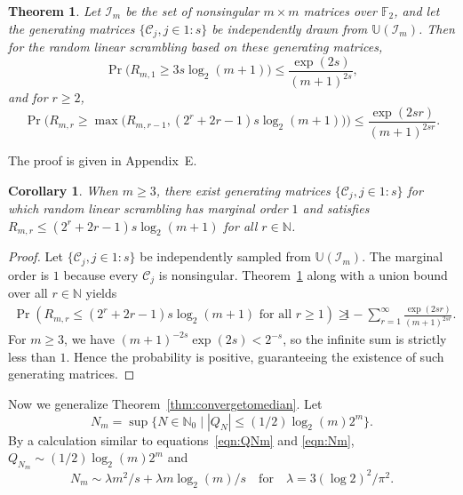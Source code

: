 \documentclass{article}
\newtheorem{theorem}{Theorem}
\newtheorem{corollary}{Corollary}
\theoremstyle{definition}
\renewcommand{\le}{\leqslant}
\renewcommand{\leq}{\leqslant}
\renewcommand{\geq}{\geqslant}
\newcommand{\natu}{\mathbb{N}}
\newcommand{\dunif}{\mathbb{U}}
\newcommand{\appE}{E}
\begin{document}
\begin{theorem}\label{thm:Rmr}
Let $\mathcal{I}_m$ be the set of nonsingular $m\times m$ matrices over $\mathbb{F}_2$, and let the generating matrices $\{\mathcal{C}_j, j\in 1{:}s\}$ be independently drawn from $\dunif (\mathcal{I}_m)$.
Then for the random linear scrambling based on these generating matrices,
    \begin{equation*}
        \Pr\Big(R_{m,1}\geq 3s\log_2(m+1) \Big) \leq \frac{\exp(2s)}{(m+1)^{2s}},
    \end{equation*}
    and for $r\geq 2$,
    \begin{equation*}
        \Pr\Big(R_{m,r}\geq \max\big(R_{m,r-1},(2^{r}+2r-1)s\log_2(m+1)\big) \Big)\leq \frac{\exp(2sr)}{(m+1)^{2sr}}.
    \end{equation*}
\end{theorem}

The proof is given in Appendix~\appE.

\begin{corollary}\label{cor:randomC}
When $m\geq 3$, there exist generating matrices $\{\mathcal{C}_j,j\in 1{:}s\}$ for which random linear scrambling has marginal order $1$ and satisfies $R_{m,r}\leq (2^r+2r-1) s\log_2(m+1)$ for all $r\in\natu$. 
\end{corollary}

\begin{proof}
    Let $\{\mathcal{C}_j, j\in 1{:}s\}$ be independently sampled from $\dunif(\mathcal{I}_m)$. The marginal order is $1$ because every $\mathcal{C}_j$ is nonsingular. Theorem~\ref{thm:Rmr} along with a union bound over all $r\in\natu$ yields
    \begin{align*}
        \Pr(R_{m,r}\leq (2^r+2r-1) s\log_2(m+1) \text{ for all }r\geq 1)\geq &1-\sum_{r=1}^{\infty}\frac{\exp(2sr)}{(m+1)^{2sr}}.
    \end{align*}
    For $m\geq 3$, we have $(m+1)^{-2s}\exp(2s)<2^{-s}$, so the infinite sum is strictly less than $1$. Hence the probability is positive, guaranteeing the existence of such generating matrices.
\end{proof}

Now we generalize Theorem~\ref{thm:convergetomedian}. Let
\begin{equation}\label{eqn:newNm}
    N_m=\sup \{N\in \natu_0\mid |Q_N|\le (1/2)\log_2(m) 2^m \}.
\end{equation}
By a calculation similar to equations~\eqref{eqn:QNm} and \eqref{eqn:Nm}, $Q_{N_m}\sim (1/2)\log_2(m) 2^m$ and
\begin{equation*}
	N_m\sim \lambda m^2/s +\lambda m\log_2(m)/s \quad\text{for} \quad\lambda=3(\log 2)^2/\pi^2.
\end{equation*}
\end{document}
